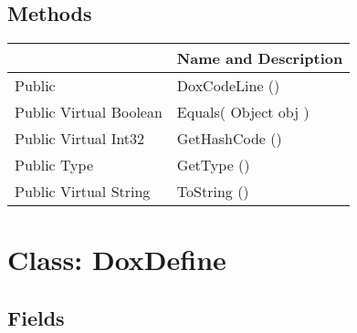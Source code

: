 \documentclass[11pt, oneside, a4paper]{book}
\begin{document}
\subsection{Methods}
\begin{center}
\begin{tabular}{| p{3cm} | p{12cm} | }
\hline
\textbf{ } & \textbf{ Name and Description}\\
\hline
 Public  &  DoxCodeLine ()\hypertarget{SoftwareEngineeringTools.{}Documentation.{}DoxCodeLine.{}DoxCodeLine}{}\\
\hline
 Public  Virtual  Boolean &  Equals(\hypertarget{SoftwareEngineeringTools.{}Documentation.{}DoxCodeLine.{}Equals\_Object}{} Object  obj  )\\
\hline
 Public  Virtual  Int32 &  GetHashCode ()\hypertarget{SoftwareEngineeringTools.{}Documentation.{}DoxCodeLine.{}GetHashCode}{}\\
\hline
 Public  Type &  GetType ()\hypertarget{SoftwareEngineeringTools.{}Documentation.{}DoxCodeLine.{}GetType}{}\\
\hline
 Public  Virtual  String &  ToString ()\hypertarget{SoftwareEngineeringTools.{}Documentation.{}DoxCodeLine.{}ToString}{}\\
\hline
\end{tabular}
\end{center}
 


\hypertarget{SoftwareEngineeringTools.{}Documentation.{}DoxDefine}{}
\section{Class: DoxDefine}

\subsection{Fields}
\end{document}
